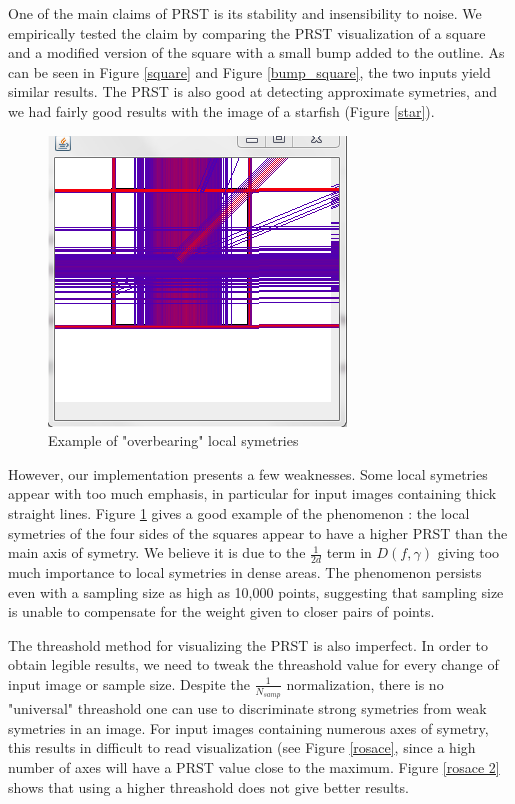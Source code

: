 \documentclass[10pt,a4paper]{article}                        %
\begin{document}
One of the main claims of PRST is its stability and insensibility to noise. We empirically tested the claim by comparing the PRST visualization of a square and a modified version of the square with a small bump added to the outline. As can be seen in Figure \ref{square} and Figure \ref{bump_square}, the two inputs yield similar results. The PRST is also good at detecting approximate symetries, and we had fairly good results with the image of a starfish (Figure \ref{star}).

\begin{figure}[h]
\centering
 \includegraphics[scale = 0.7]{img/n_16_sample_1000.png}
 \caption{Example of "overbearing" local symetries}
 \label{thick_square}
\end{figure}

However, our implementation presents a few weaknesses. Some local symetries appear with too much emphasis, in particular for input images containing thick straight lines. Figure \ref{thick_square} gives a good example of the phenomenon : the local symetries of the four sides of the squares appear to have a higher PRST than the main axis of symetry. We believe it is due to the $\frac{1}{2d}$ term in $D(f,\gamma)$ giving too much importance to local symetries in dense areas. The phenomenon persists even with a sampling size as high as 10,000 points, suggesting that sampling size is unable to compensate for the weight given to closer pairs of points.

The threashold method for visualizing the PRST is also imperfect. In order to obtain legible results, we need to tweak the threashold value for every change of input image or sample size. Despite the $\frac{1}{N_{samp}}$ normalization, there is no "universal" threashold one can use to discriminate strong symetries from weak symetries in an image. For input images containing numerous axes of symetry, this results in difficult to read visualization (see Figure \ref{rosace}, since a high number of axes will have a PRST value close to the maximum. Figure \ref{rosace 2} shows that using a higher threashold does not give better results.
\end{document}
